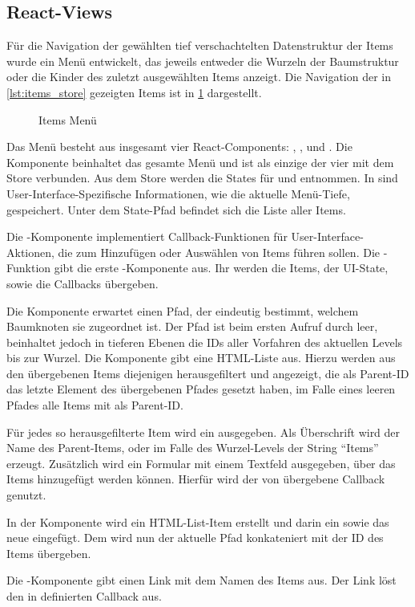 \subsection{React-Views}
\label{ssec:fi_react_views}

Für die Navigation der gewählten tief verschachtelten Datenstruktur der Items
wurde ein Menü entwickelt, das jeweils entweder die Wurzeln der Baumstruktur
oder die Kinder des zuletzt ausgewählten Items anzeigt.  Die Navigation der in
\cref{lst:items_store} gezeigten Items ist in \cref{fig:items_menu} dargestellt.

\begin{figure}
	\centering
	
	\caption{Items Menü}
	\label{fig:items_menu}
\end{figure}

Das Menü besteht aus insgesamt vier React-Components: ,
,  und .  Die Komponente
 beinhaltet das gesamte Menü und ist als einzige der vier mit dem
Store verbunden.  Aus dem Store werden die States für
 und  entnommen.  In  sind
User-Interface-Spezifische Informationen, wie die aktuelle Menü-Tiefe,
gespeichert.  Unter dem State-Pfad  befindet sich
die Liste aller Items.

Die -Komponente implementiert Callback-Funktionen für
User-Interface-Aktionen, die zum Hinzufügen oder Auswählen von Items führen
sollen.  Die -Funktion gibt die erste -Komponente
aus.  Ihr werden die Items, der UI-State, sowie die Callbacks übergeben.

Die Komponente  erwartet einen Pfad, der eindeutig bestimmt,
welchem Baumknoten sie zugeordnet ist.  Der Pfad ist beim ersten Aufruf durch
 leer, beinhaltet jedoch in tieferen Ebenen die IDs aller Vorfahren
des aktuellen Levels bis zur Wurzel.  Die Komponente gibt eine HTML-Liste aus.
Hierzu werden aus den übergebenen Items diejenigen herausgefiltert und
angezeigt, die als Parent-ID das letzte Element des übergebenen Pfades gesetzt
haben, im Falle eines leeren Pfades alle Items mit  als Parent-ID.

Für jedes so herausgefilterte Item wird ein  ausgegeben.
Als Überschrift wird der Name des Parent-Items, oder im Falle des Wurzel-Levels
der String \enquote{Items} erzeugt.  Zusätzlich wird ein Formular mit einem
Textfeld ausgegeben, über das Items hinzugefügt werden können.  Hierfür wird
der von  übergebene Callback genutzt.

In der Komponente  wird ein HTML-List-Item erstellt und
darin ein  sowie das neue  eingefügt.  Dem
 wird nun der aktuelle Pfad konkateniert mit der ID des Items
übergeben.

Die -Komponente gibt einen Link mit dem Namen des Items aus.  Der
Link löst den in  definierten Callback aus.
